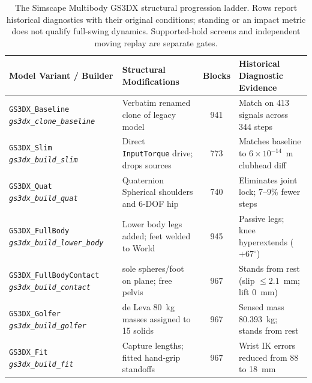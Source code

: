 \documentclass[11pt,a4paper]{article}
\begin{document}
\begin{table}[!htb]
\centering
\footnotesize
\caption{The Simscape Multibody GS3DX structural progression ladder.
Rows report historical diagnostics with their original conditions;
standing or an impact metric does not qualify full-swing dynamics.
Supported-hold screens and independent moving replay are separate gates.}
\label{tab:variant_ladder}
\begin{tabularx}{\textwidth}{p{4.2cm} >{\raggedright\arraybackslash}X c >{\raggedright\arraybackslash}X}
\toprule
\textbf{Model Variant / Builder} & \textbf{Structural Modifications} & \textbf{Blocks} & \textbf{Historical Diagnostic Evidence} \\
\midrule
\texttt{GS3DX\_Baseline} \newline \textit{\texttt{gs3dx\_clone\_baseline}} & Verbatim renamed clone of legacy model & 941 & Match on 413 signals across 344 steps \\
\addlinespace[2pt]
\texttt{GS3DX\_Slim} \newline \textit{\texttt{gs3dx\_build\_slim}} & Direct \texttt{InputTorque} drive; drops sources & 773 & Matches baseline to $6 \times 10^{-14}$~m clubhead diff \\
\addlinespace[2pt]
\texttt{GS3DX\_Quat} \newline \textit{\texttt{gs3dx\_build\_quat}} & Quaternion Spherical shoulders and 6-DOF hip & 740 & Eliminates joint lock; 7--9\% fewer steps \\
\addlinespace[2pt]
\texttt{GS3DX\_FullBody} \newline \textit{\texttt{gs3dx\_build\_lower\_body}} & Lower body legs added; feet welded to World & 945 & Passive legs; knee hyperextends ($+67^\circ$) \\
\addlinespace[2pt]
\texttt{GS3DX\_FullBodyContact} \newline \textit{\texttt{gs3dx\_build\_contact}} & 3 sole spheres/foot on plane; free pelvis & 967 & Stands from rest (slip $\le 2.1$~mm; lift 0~mm) \\
\addlinespace[2pt]
\texttt{GS3DX\_Golfer} \newline \textit{\texttt{gs3dx\_build\_golfer}} & de Leva 80~kg masses assigned to 15 solids & 967 & Sensed mass 80.393~kg; stands from rest \\
\addlinespace[2pt]
\texttt{GS3DX\_Fit} \newline \textit{\texttt{gs3dx\_build\_fit}} & Capture lengths; fitted hand-grip standoffs & 967 & Wrist IK errors reduced from 88 to 18~mm \\

\end{tabularx}
\end{table}
\end{document}
